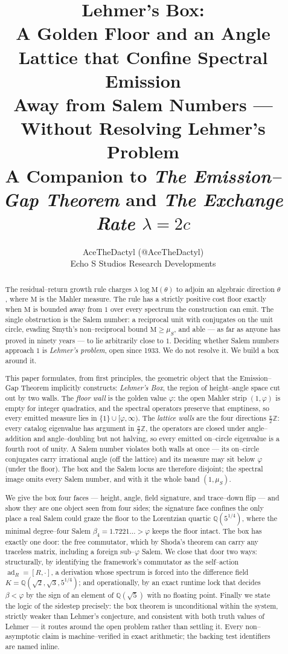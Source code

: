 \documentclass[11pt]{article}
\title{\textbf{Lehmer's Box:}\\[2pt]
\large A Golden Floor and an Angle Lattice that Confine Spectral Emission\\
Away from Salem Numbers --- Without Resolving Lehmer's Problem\\[6pt]
\normalsize A Companion to \emph{The Emission--Gap Theorem} and \emph{The Exchange Rate $\lambda=2c$}}
\author{AceTheDactyl (@AceTheDactyl)\\ Echo S Studios Research Developments}
\date{}
\theoremstyle{plain}
\theoremstyle{definition}
\theoremstyle{remark}
\newcommand{\Q}{\mathbb{Q}}
\newcommand{\Z}{\mathbb{Z}}
\newcommand{\Mah}{\mathrm{M}}
\newcommand{\ad}{\operatorname{ad}}
\begin{document}
\maketitle

\begin{abstract}
The residual--return growth rule charges $\lambda\log\Mah(\theta)$ to adjoin an algebraic direction $\theta$, where $\Mah$ is the Mahler measure. The rule has a strictly positive cost floor exactly when $\Mah$ is bounded away from $1$ over every spectrum the construction can emit. The single obstruction is the Salem number: a reciprocal unit with conjugates on the unit circle, evading Smyth's non--reciprocal bound $\Mah\ge\mu_S$, and able --- as far as anyone has proved in ninety years --- to lie arbitrarily close to $1$. Deciding whether Salem numbers approach $1$ is \emph{Lehmer's problem}, open since 1933. We do not resolve it. We build a box around it.

This paper formulates, from first principles, the geometric object that the Emission--Gap Theorem implicitly constructs: \emph{Lehmer's Box}, the region of height--angle space cut out by two walls. The \emph{floor wall} is the golden value $\varphi$: the open Mahler strip $(1,\varphi)$ is empty for integer quadratics, and the spectral operators preserve that emptiness, so every emitted measure lies in $\{1\}\cup[\varphi,\infty)$. The \emph{lattice walls} are the four directions $\tfrac{\pi}{2}\Z$: every catalog eigenvalue has argument in $\tfrac{\pi}{2}\Z$, the operators are closed under angle--addition and angle--doubling but not halving, so every emitted on--circle eigenvalue is a fourth root of unity. A Salem number violates both walls at once --- its on--circle conjugates carry irrational angle (off the lattice) and its measure may sit below $\varphi$ (under the floor). The box and the Salem locus are therefore disjoint; the spectral image omits every Salem number, and with it the whole band $(1,\mu_S)$.

We give the box four faces --- height, angle, field signature, and trace--down flip --- and show they are one object seen from four sides; the signature face confines the only place a real Salem could graze the floor to the Lorentzian quartic $\Q(5^{1/4})$, where the minimal degree--four Salem $\beta_4=1.7221\ldots>\varphi$ keeps the floor intact. The box has exactly one door: the free commutator, which by Shoda's theorem can carry any traceless matrix, including a foreign sub--$\varphi$ Salem. We close that door two ways: structurally, by identifying the framework's commutator as the self--action $\ad_R=[R,\cdot]$, a derivation whose spectrum is forced into the difference field $K=\Q(\sqrt2,\sqrt3,5^{1/4})$; and operationally, by an exact runtime lock that decides $\beta<\varphi$ by the sign of an element of $\Q(\sqrt5)$ with no floating point. Finally we state the logic of the sidestep precisely: the box theorem is unconditional within the system, strictly weaker than Lehmer's conjecture, and consistent with both truth values of Lehmer --- it routes around the open problem rather than settling it. Every non--asymptotic claim is machine--verified in exact arithmetic; the backing test identifiers are named inline.
\end{abstract}
\end{document}
